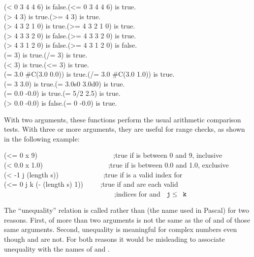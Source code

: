 \begin{defun}[Function]
\begin{lisp}
(< 0 3 4 4 6) \textrm{is false.}\>(<= 0 3 4 4 6) \textrm{is true.} \\
(> 4 3) \textrm{is true.}\>(>= 4 3) \textrm{is true.} \\
(> 4 3 2 1 0) \textrm{is true.}\>(>= 4 3 2 1 0) \textrm{is true.} \\
(> 4 3 3 2 0) \textrm{is false.}\>(>= 4 3 3 2 0) \textrm{is true.} \\
(> 4 3 1 2 0) \textrm{is false.}\>(>= 4 3 1 2 0) \textrm{is false.} \\
(= 3) \textrm{is true.}\>(/= 3) \textrm{is true.} \\
(< 3) \textrm{is true.}\>(<= 3) \textrm{is true.} \\
(= 3.0 \#C(3.0 0.0)) \textrm{is true.}\>(/= 3.0 \#C(3.0 1.0)) \textrm{is true.} \\
(= 3 3.0) \textrm{is true.}\>(= 3.0s0 3.0d0) \textrm{is true.} \\
(= 0.0 -0.0) \textrm{is true.}\>(= 5/2 2.5) \textrm{is true.} \\
(> 0.0 -0.0) \textrm{is false.}\>(= 0 -0.0) \textrm{is true.}
\end{lisp}
With two arguments, these functions perform the usual arithmetic
comparison tests.
With three or more arguments, they are useful for range checks,
as shown in the following example:
\begin{lisp}
(<= 0 x 9)~~~~~~~~~~~~~~~~~~~~~~;\textrm{true if  is between 0 and 9, inclusive} \\
(< 0.0 x 1.0)~~~~~~~~~~~~~~~~~~~;\textrm{true if  is between 0.0 and 1.0, exclusive} \\
(< -1 j (length s))~~~~~~~~~~~~~;\textrm{true if  is a valid index for } \\
(<= 0 j k (- (length s) 1))~~~~~;\textrm{true if  and  are each valid} \\
~~~~~~~~~~~~~~~~~~~~~~~~~~~~~~~~;\textrm{indices for  and $\cdf{j}\leq\cdf{k}$}
\end{lisp}


\beforenoterule
\begin{rationale}
The ``unequality'' relation is called \cdf{/=} rather than
\cd{<>}
(the name used in Pascal) for two reasons.  First, \cdf{/=} of more than two
arguments is not the same as the  of \cdf{<} and \cdf{>} of those same
arguments.  Second, unequality is meaningful for complex numbers even though
\cdf{<} and \cdf{>} are not.  For both reasons it would be misleading to
associate unequality with the names of \cdf{<} and \cdf{>}.
\end{rationale}
\afternoterule
\end{defun}

